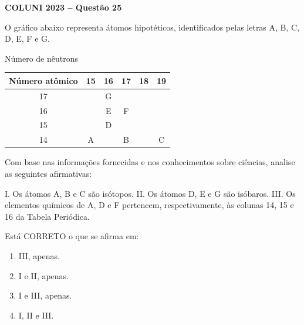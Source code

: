 \textbf{COLUNI 2023 -- Questão 25}\par\medskip O gráfico abaixo representa átomos hipotéticos, identificados pelas letras A, B, C, D, E, F e G.

\begin{center}
Número de nêutrons
\begin{tabular}{c|ccccc}
Número atômico & 15 & 16 & 17 & 18 & 19 \\
\hline
17 & & G & & & \\
16 & & E & F & & \\
15 & & D & & & \\
14 & A & & B & & C \\
\end{tabular}
\end{center}

\par

Com base nas informações fornecidas e nos conhecimentos sobre ciências, analise as seguintes afirmativas:

\par

I. Os átomos A, B e C são isótopos. II. Os átomos D, E e G são isóbaros. III. Os elementos químicos de A, D e F pertencem, respectivamente, às colunas 14, 15 e 16 da Tabela Periódica.

\par

Está CORRETO o que se afirma em:\begin{enumerate}
\item III, apenas.
\item I e II, apenas.
\item I e III, apenas.
\item I, II e III.\end{enumerate}
